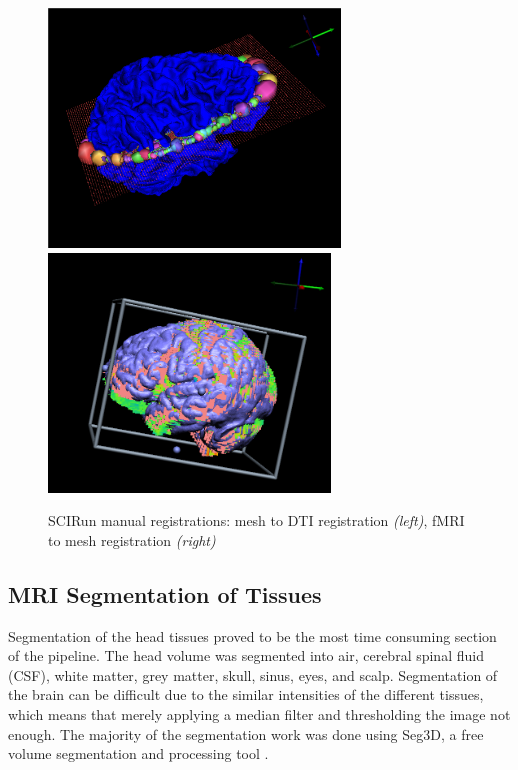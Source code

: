 \begin{figure}[H]
\begin{center}
\includegraphics[height = 2.5in]{Figures/DTI_reg}
\includegraphics[height = 2.5in]{Figures/fmri_reg}
\caption{SCIRun manual registrations: mesh to DTI registration \textit{(left)}, fMRI to mesh registration \textit{(right)}}
\label{fig:dtireg}
\end{center}
\end{figure}

\subsection{MRI Segmentation of Tissues}
\label{sec:Seg}


Segmentation of the head tissues proved to be the most time consuming section of the pipeline. The head volume was segmented into air, cerebral spinal fluid (CSF), white matter, grey matter, skull, sinus, eyes, and scalp. Segmentation of the brain can be difficult due to the similar intensities of the different tissues, which means that merely applying a median filter and thresholding the image not enough. The majority of the segmentation work was done using Seg3D, a free volume segmentation and processing tool \cite{ref:seg3d}.

